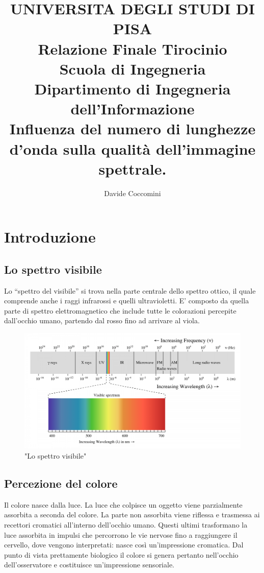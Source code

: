 \documentclass[a4paper,11pt]{article}
\author{Davide Coccomini}
\title{\textbf{UNIVERSITA DEGLI STUDI DI PISA} \\[0.4in]
        Relazione Finale Tirocinio \\
    Scuola di Ingegneria \\
    Dipartimento di Ingegneria dell’Informazione \\[1in]
    Influenza del numero di lunghezze d’onda sulla qualità dell’immagine spettrale.}
\date{}
\begin{document}
        \maketitle
        
    
    \newpage
        \tableofcontents
        \section{Introduzione}
        \subsection{Lo spettro visibile}
        Lo “spettro del visibile” si trova nella parte centrale dello spettro ottico, il quale
        comprende anche i raggi infrarossi e quelli ultravioletti. E’ composto da quella parte di
        spettro elettromagnetico che include tutte le colorazioni percepite dall’occhio umano,
        partendo dal rosso fino ad arrivare al viola.
        \begin{figure}[h]
            \centering
            \includegraphics[scale=0.8]{colorimetria3}
            \caption{"Lo spettro visibile"}
        \end{figure}
        \subsection{Percezione del colore}
        Il colore nasce dalla luce. La luce che colpisce un oggetto viene parzialmente assorbita a
        seconda del colore. La parte non assorbita viene riflessa e trasmessa ai recettori cromatici
        all’interno dell’occhio umano. Questi ultimi trasformano la luce assorbita in impulsi che
        percorrono le vie nervose fino a raggiungere il cervello, dove vengono interpretati: nasce così
        un’impressione cromatica. Dal punto di vista prettamente biologico il colore si genera pertanto
        nell’occhio dell’osservatore e costituisce un’impressione sensoriale.
\end{document}
